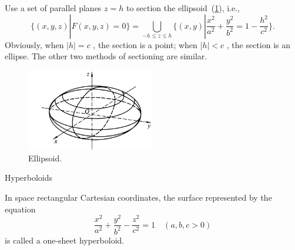 \documentclass[11pt]{../../TexTemplate/elegantbook} %
\begin{document}
Use a set of parallel planes \(z=h\) to section the ellipsoid~(\ref{fig:Ellipsoid1}), i.e., 
\[
\{ (x,y,z) | F(x,y,z) = 0 \} = 
\bigcup_{-h \leq z \leq h} \{ (x,y) | \frac{x^{2}}{a^{2}} + \frac{y^{2}}{b^{2}} = 1 - \frac{h^{2}}{c^{2}}\}.
\]      
Obviously, when \(|h| = c\) , the section is a point; 
when \(|h| < c\) , the section is an ellipse. 
The other two methods of sectioning are similar.
\begin{figure}[h]
    \centering
    \includegraphics[width=0.5\textwidth]{img/Ellipsoid.png}
    \caption{Ellipsoid.}
    \label{fig:Ellipsoid1}
\end{figure}

\begin{leftbarTitle}{Hyperboloids}\end{leftbarTitle}
In space rectangular Cartesian coordinates, 
the surface represented by the equation
\[
\frac{x^{2}}{a^{2}} + \frac{y^{2}}{b^{2}} - \frac{z^{2}}{c^{2}} = 1\quad (a,b,c > 0)
\]
is called a one-sheet hyperboloid.
\end{document}
